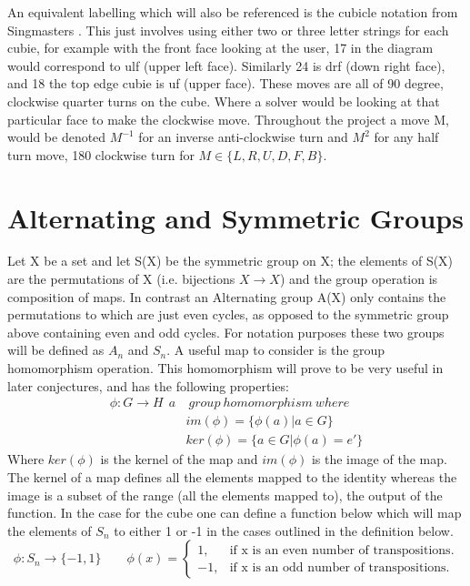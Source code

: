 \documentclass{article}
\newcounter{prop}[section]\setcounter{prop}{0}
\newcounter{lem}[section]\setcounter{lem}{0}
\begin{document}
An equivalent labelling which will also be referenced is the cubicle notation from Singmasters \cite{Magic}. This just involves using either two or three letter strings for each cubie, for example with the front face looking at the user, 17 in the diagram would correspond to ulf (upper left face). Similarly 24 is drf (down right face), and 18 the top edge cubie is uf (upper face).
These moves are all of 90 degree, clockwise quarter turns on the cube. Where a solver would be looking at that particular face to make the clockwise move. Throughout the project a move M, would be denoted $M^{-1}$ for an inverse anti-clockwise turn and $M^{2}$ for any half turn move, 180 clockwise turn for $M \in \{L,R,U,D,F,B\}$.

\newpage
\section{Alternating and Symmetric Groups}
Let X be a set and let S(X) be the symmetric group on X; the elements of S(X)
are the permutations of X (i.e. bijections $X\rightarrow X$) and the group operation is
composition of maps.
In contrast an Alternating group A(X) only contains the permutations to which are just even cycles, as opposed to the symmetric group above containing even and odd cycles.  For notation purposes these two groups will be defined as $A_{n}$ and $S_{n}$. \newline A useful map to consider is the group homomorphism operation. This homomorphism will prove to be very useful in later conjectures, and has the following properties:
\begin{align*}
\phi : G\rightarrow H\ \ a&\ group\  homomorphism\ where\\
&im(\phi) = \{\phi(a) | a \in G\}\\
&ker(\phi)= \{a\in G |\phi(a) = e'\}
\end{align*}
Where $ker(\phi)$ is the kernel of the map and $im(\phi)$ is the image of the map. The kernel of a map defines all the elements mapped to the identity whereas the image is a subset of the range (all the elements mapped to), the output of the function.
In the case for the cube one can define a function below which will map the elements of $S_{n}$ to either 1 or -1 in the cases outlined in the definition below.
\begin{equation}
\phi : S_{n} \rightarrow \{-1,1\} \qquad
  \phi(x)=\begin{cases}
    1, & \text{if x is an even number of transpositions}.\\
    -1, & \text{if x is an odd number of transpositions}.
  \end{cases}
\end{equation}
\end{document}
